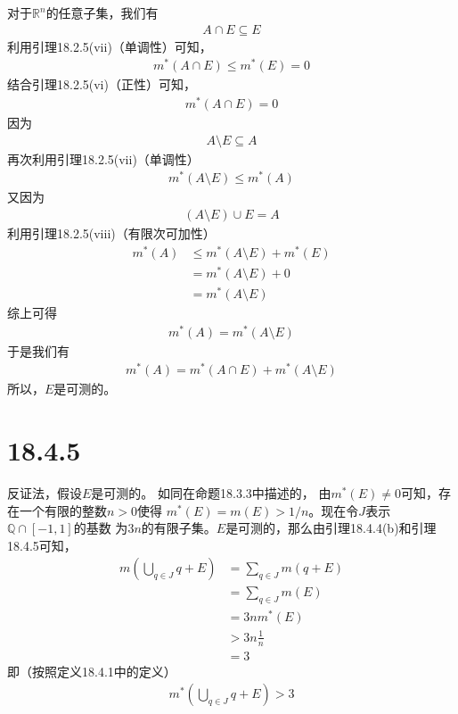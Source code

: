 \documentclass{article}
\begin{document}
\begin{itemize}
        对于$\mathbb{R}^n$的任意子集，我们有
        \begin{align*}
          A \cap E \subseteq E
        \end{align*}
        利用引理18.2.5(vii)（单调性）可知，
        \begin{align*}
          m^{\ast}(A \cap E) \leq m^{\ast}(E) = 0
        \end{align*}
        结合引理18.2.5(vi)（正性）可知，
        \begin{align*}
          m^{\ast}(A \cap E) = 0
        \end{align*}
        因为
        \begin{align*}
          A \setminus E \subseteq A
        \end{align*}
        再次利用引理18.2.5(vii)（单调性）
        \begin{align*}
          m^{\ast}(A \setminus E) \leq m^{\ast}(A)
        \end{align*}
        又因为
        \begin{align*}
          (A \setminus E) \cup E = A
        \end{align*}
        利用引理18.2.5(viii)（有限次可加性）
        \begin{align*}
          m^{\ast}(A) & \leq m^{\ast}(A \setminus E) + m^{\ast}(E) \\
                      & = m^{\ast}(A \setminus E) + 0              \\
                      & = m^{\ast}(A \setminus E)
        \end{align*}
        综上可得
        \begin{align*}
          m^{\ast}(A) = m^{\ast}(A \setminus E)
        \end{align*}
        于是我们有
        \begin{align*}
          m^{\ast}(A) = m^{\ast}(A \cap E) + m^{\ast}(A \setminus E)
        \end{align*}
        所以，$E$是可测的。

\end{itemize}

\section*{18.4.5}

反证法，假设$E$是可测的。
如同在命题18.3.3中描述的，
由$m^{\ast}(E) \neq 0$可知，存在一个有限的整数$n > 0$使得
$m^{\ast}(E) = m(E) > 1/n$。现在令$J$表示$\mathbb{Q} \cap [-1, 1]$的基数
为$3n$的有限子集。$E$是可测的，那么由引理18.4.4(b)和引理18.4.5可知，
\begin{align*}
  m\left(\bigcup\limits_{q \in J} q + E\right)
   & = \sum\limits_{q \in J} m(q + E) \\
   & = \sum\limits_{q \in J} m(E)     \\
   & = 3n m^{\ast}(E)                 \\
   & > 3n \frac{1}{n}                 \\
   & = 3
\end{align*}
即（按照定义18.4.1中的定义）
\begin{align*}
  m^{\ast}\left(\bigcup\limits_{q \in J} q + E\right) > 3
\end{align*}
\end{document}
